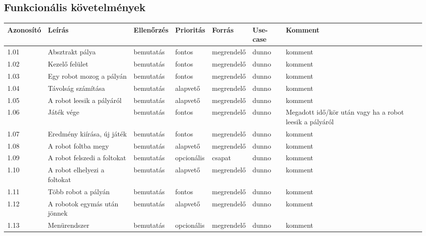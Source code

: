 \subsection{Funkcionális követelmények}


\begin{longtable}{| l | l | l | l | l | l | l |}
\hline
\textbf{Azonosító}   & \textbf{Leírás} & \textbf{Ellenőrzés} & \textbf{Prioritás} & \textbf{Forrás} & \textbf{Use-case} & \textbf{Komment} \tabularnewline
\hline\hline
1.01 & Absztrakt pálya & bemutatás & fontos & megrendelő & dunno & komment \tabularnewline
\hline
1.02 & Kezelő felület & bemutatás & fontos & megrendelő & dunno & komment \tabularnewline
\hline
1.03 & Egy robot mozog a pályán & bemutatás & fontos & megrendelő & dunno & komment \tabularnewline
\hline
1.04 & Távolság számítása & bemutatás & alapvető & megrendelő & dunno & komment \tabularnewline
\hline
1.05 & A robot leesik a pályáról & bemutatás & alapvető & megrendelő & dunno & komment \tabularnewline
\hline
1.06 & Játék vége & bemutatás & fontos & megrendelő & dunno & Megadott idő/kör után vagy ha a robot leesik a pályáról \tabularnewline
\hline
1.07 & Eredmény kiírása, új játék & bemutatás & fontos & megrendelő & dunno & komment \tabularnewline
\hline
1.08 & A robot foltba megy& bemutatás & alapvető & megrendelő & dunno & komment \tabularnewline
\hline
1.09 & A robot felszedi a foltokat & bemutatás & opcionális & csapat & dunno & komment \tabularnewline
\hline
1.10 & A robot elhelyezi a foltokat & bemutatás & alapvető & megrendelő & dunno & komment \tabularnewline
\hline
1.11 & Több robot a pályán & bemutatás & fontos & megrendelő & dunno & komment \tabularnewline
\hline
1.12 & A robotok egymás után jönnek & bemutatás & alapvető & megrendelő & dunno & komment \tabularnewline
\hline
1.13 & Menürendszer & bemutatás & opcionális & megrendelő & dunno & komment \tabularnewline
\hline
\end{longtable}


